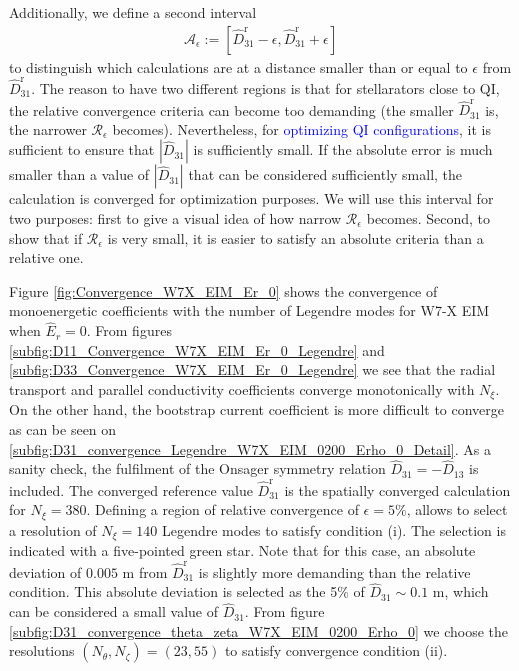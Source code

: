 Additionally, we define a second interval 
%
\begin{align}
	\mathcal{A}_{\epsilon}:=
	\left[
	\widehat{D}_{31}^{\text{r}}-\epsilon, \widehat{D}_{31}^{\text{r}}+\epsilon 
	\right]
\end{align}
to distinguish which calculations are at a distance smaller than or equal to $\epsilon$ from $\widehat{D}_{31}^{\text{r}}$. The reason to have two different regions is that for stellarators close to QI, the relative convergence criteria can become too demanding (the smaller $\widehat{D}_{31}^{\text{r}}$ is, the narrower $\mathcal{R}_{\epsilon}$ becomes). Nevertheless, for \textcolor{blue}{optimizing QI configurations}, it is sufficient to ensure that $|\widehat{D}_{31}|$ is sufficiently small. If the absolute error is much smaller than a value of $|\widehat{D}_{31}|$ that can be considered sufficiently small, the calculation is converged for optimization purposes. We will use this interval for two purposes: first to give a visual idea of how narrow $\mathcal{R}_{\epsilon}$ becomes. Second, to show that if $\mathcal{R}_{\epsilon}$ is very small, it is easier to satisfy an absolute criteria than a relative one. 

Figure \ref{fig:Convergence_W7X_EIM_Er_0} shows the convergence of monoenergetic coefficients with the number of Legendre modes for W7-X EIM when $\hat{E}_r=0$. From figures \ref{subfig:D11_Convergence_W7X_EIM_Er_0_Legendre} and \ref{subfig:D33_Convergence_W7X_EIM_Er_0_Legendre} we see that the radial transport and parallel conductivity coefficients converge monotonically with $N_\xi$. On the other hand, the bootstrap current coefficient is more difficult to converge as can be seen on \ref{subfig:D31_convergence_Legendre_W7X_EIM_0200_Erho_0_Detail}. As a sanity check, the fulfilment of the Onsager symmetry relation $\widehat{D}_{31}= - \widehat{D}_{13}$ is included. The converged reference value $\widehat{D}_{31}^{\text{r}}$ is the spatially converged calculation for $N_\xi=380$. Defining a region of relative convergence of $\epsilon=5\%$, allows to select a resolution of $N_\xi=140$ Legendre modes to satisfy condition (i). The selection is indicated with a five-pointed green star. Note that for this case, an absolute deviation of $0.005$ m from $\widehat{D}_{31}^{\text{r}}$ is slightly more demanding than the relative condition. This absolute deviation is selected as the 5\% of $\widehat{D}_{31}\sim 0.1$ m, which can be considered a small value of $\widehat{D}_{31}$. From figure \ref{subfig:D31_convergence_theta_zeta_W7X_EIM_0200_Erho_0} we choose the resolutions $(N_\theta,N_\zeta)=(23,55)$ to satisfy convergence condition (ii). 

